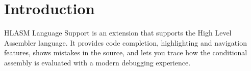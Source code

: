 \chapter{Introduction}

HLASM Language Support is an extension that supports the High Level Assembler language. It provides code completion, highlighting and navigation features, shows mistakes in the source, and lets you trace how the conditional assembly is evaluated with a modern debugging experience.